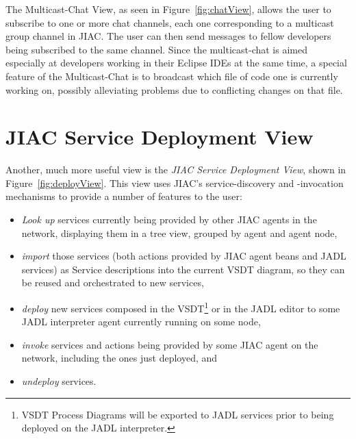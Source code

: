 The Multicast-Chat View, as seen in Figure~\ref{fig:chatView}, allows the user to
subscribe to one or more chat channels, each one corresponding to a multicast
group channel in JIAC.  The user can then send messages to fellow developers being
subscribed to the same channel.  Since the multicast-chat is aimed especially at
developers working in their Eclipse IDEs at the same time, a special feature of
the Multicast-Chat is to broadcast which file of code one is currently working
on, possibly alleviating problems due to conflicting changes on that file.



\section{JIAC Service Deployment View}

Another, much more useful view is the \emph{JIAC Service Deployment View}, shown
in Figure~\ref{fig:deployView}.  This view uses JIAC's service-discovery and
-invocation mechanisms to provide a number of features to the user:

\begin{itemize}
	\item \emph{Look up} services currently being provided by other JIAC agents in
	the network, displaying them in a tree view, grouped by agent and agent node,

	\item \emph{import} those services (both actions provided by JIAC agent beans
	and JADL services) as Service descriptions into the current VSDT diagram, so
	they can be reused and orchestrated to new services,

	\item \emph{deploy} new services composed in the VSDT\footnote{VSDT Process
	Diagrams will be exported to JADL services prior to being deployed on the
	JADL interpreter.} or in the JADL editor to some JADL interpreter agent
	currently running on some node,

	\item \emph{invoke} services and actions being provided by some JIAC agent on
	the network, including the ones just deployed, and

	\item \emph{undeploy} services.
\end{itemize}

